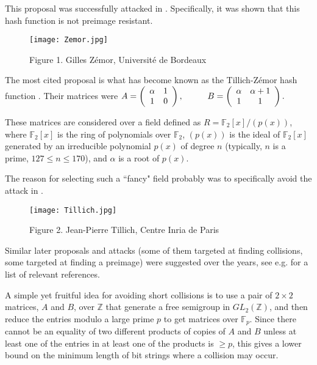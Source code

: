 \documentclass{lmsedition}
\newcommand{\Z}{\mathbb{Z}}
\newcommand{\F}{\mathbb{F}}
\begin{document}
\begin{twoblock}
This proposal was successfully attacked in \cite{TZ_attack}. Specifically, it was shown that this hash function is not preimage resistant.

\begin{wrapfigure}{l}{32mm}
\texttt{[image: Zemor.jpg]}
\caption*{\textcolor{dcolor}{Figure 1. Gilles Zémor, Université de Bordeaux}} 
\end{wrapfigure}

The most cited proposal is what has become known as the Tillich-Z\'emor hash function \cite{TZ}. Their matrices were %
$A = \left(
 \begin{array}{cc} \alpha & 1 \\ 1 & 0 \end{array} \right) , \hskip 1cm B = \left(
 \begin{array}{cc} \alpha & \alpha+1 \\ 1 & 1 \end{array} \right).$

\noindent  These matrices are considered over a field defined as
$R=\F_2[x]/(p(x))$, where  $\F_2[x]$ is the ring of polynomials over
$\F_2$,  $(p(x))$ is the ideal of $\F_2[x]$
generated by an irreducible polynomial $p(x)$ of degree $n$
(typically,  $n$ is a prime, $127 \le n \le 170$), and  $\alpha$ is a root of $p(x)$.

The reason for selecting such a ``fancy" field probably was to specifically avoid the attack in \cite{TZ_attack}.

\begin{wrapfigure}{l}{32mm}
\texttt{[image: Tillich.jpg]}
\caption*{\textcolor{dcolor}{Figure 2. Jean-Pierre Tillich, Centre Inria de Paris}} 
\end{wrapfigure}

Similar later proposals and attacks (some of them targeted at finding collisions, some targeted at finding a preimage) were suggested over the years, see e.g. \cite{cookies} for a list of relevant references.  %


A simple yet fruitful idea for avoiding short collisions is to use a pair of $2 \times
2$ matrices, $A$ and $B$, over $\Z$  that generate a free semigroup in $GL_2(\Z)$,
and then reduce the entries modulo a large prime $p$ to get matrices
over $\F_p$. Since there cannot be an equality of two different
products of copies of $A$ and $B$ unless at least one of
the entries in at least one of the products is $\ge p$, this gives a
lower bound on the minimum length of bit strings where a collision
may occur.


\end{twoblock}
\end{document}
